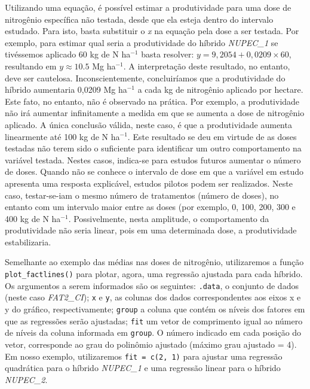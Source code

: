 \documentclass[
]{book}
\begin{document}
Utilizando uma equação, é possível estimar a produtividade para uma dose de nitrogênio específica não testada, desde que ela esteja dentro do intervalo estudado. Para isto, basta substituir o \emph{x} na equação pela dose a ser testada. Por exemplo, para estimar qual seria a produtividade do híbrido \emph{NUPEC\_1} se tivéssemos aplicado 60 kg de N ha\(^{-1}\) basta resolver: \(y = 9,2054 + 0,0209\times 60\), resultando em \(y \approx 10.5\) Mg ha\(^{-1}\). A interpretação deste resultado, no entanto, deve ser cautelosa. Inconscientemente, concluiríamos que a produtividade do híbrido aumentaria 0,0209 Mg ha\(^{-1}\) a cada kg de nitrogênio aplicado por hectare. Este fato, no entanto, não é observado na prática. Por exemplo, a produtividade não irá aumentar infinitamente a medida em que se aumenta a dose de nitrogênio aplicado. A única conclusão válida, neste caso, é que a produtividade aumenta linearmente até 100 kg de N ha\(^{-1}\). Este resultado se deu em virtude de as doses testadas não terem sido o suficiente para identificar um outro comportamento na variável testada. Nestes casos, indica-se para estudos futuros aumentar o número de doses. Quando não se conhece o intervalo de dose em que a variável em estudo apresenta uma resposta explicável, estudos pilotos podem ser realizados. Neste caso, testar-se-iam o mesmo número de tratamentos (número de doses), no entanto com um intervalo maior entre as doses (por exemplo, 0, 100, 200, 300 e 400 kg de N ha\(^{-1}\). Possivelmente, nesta amplitude, o comportamento da produtividade não seria linear, pois em uma determinada dose, a produtividade estabilizaria.

Semelhante ao exemplo das médias nas doses de nitrogênio, utilizaremos a função \texttt{plot\_factlines()}  para plotar, agora, uma regressão  ajustada para cada híbrido. Os argumentos a serem informados são os seguintes: \texttt{.data}, o conjunto de dados (neste caso \emph{FAT2\_CI}); \texttt{x} e \texttt{y}, as colunas dos dados correspondentes aos eixos x e y do gráfico, respectivamente; \texttt{group} a coluna que contém os níveis dos fatores em que as regressões serão ajustadas; \texttt{fit} um vetor de comprimento igual ao número de níveis da coluna informada em \texttt{group}. O número indicado em cada posição do vetor, corresponde ao grau do polinômio ajustado (máximo grau ajustado = 4). Em nosso exemplo, utilizaremos \texttt{fit\ =\ c(2,\ 1)} para ajustar uma regressão quadrática para o híbrido \emph{NUPEC\_1} e uma regressão linear para o híbrido \emph{NUPEC\_2}.
\end{document}
